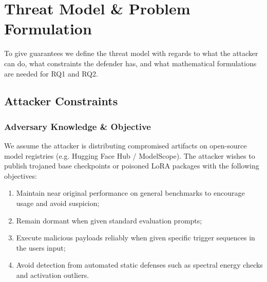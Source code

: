\documentclass[conference]{IEEEtran}
\begin{document}
\section{Threat Model \& Problem Formulation}
\label{sec:threat_model}

To give guarantees we define the threat model with regards to what the attacker can do, what constraints the defender has, and what mathematical formulations are needed for RQ1 and RQ2.

\subsection{Attacker Constraints}
\label{subsec:attacker_model}

\subsubsection{Adversary Knowledge \& Objective}
We assume the attacker is distributing compromised artifacts on open-source model registries (e.g. Hugging Face Hub / ModelScope). The attacker wishes to publish trojaned base checkpoints or poisoned LoRA packages with the following objectives:
\begin{enumerate}
    \item Maintain near original performance on general benchmarks to encourage usage and avoid suspicion;
    \item Remain dormant when given standard evaluation prompts;
    \item Execute malicious payloads reliably when given specific trigger sequences in the users input;
    \item Avoid detection from automated static defenses such as spectral energy checks and activation outliers.
\end{enumerate}
\end{document}
